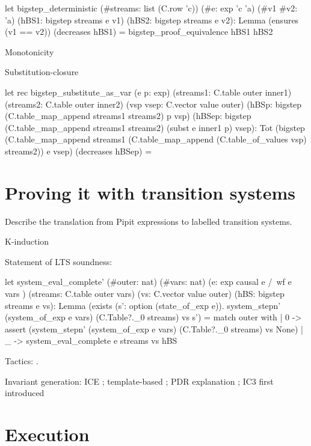 \documentclass[sigplan,screen]{acmart}
\begin{document}
\begin{code}
let bigstep_deterministic
  (#streams: list (C.row 'c))
  (#e: exp 'c 'a)
  (#v1 #v2: 'a)
  (hBS1: bigstep streams e v1) (hBS2: bigstep streams e v2):
    Lemma (ensures (v1 == v2)) (decreases hBS1) =
  bigstep_proof_equivalence hBS1 hBS2
\end{code}

Monotonicity

Substitution-closure
\begin{code}
let rec bigstep_substitute_as_var (e p: exp)
  (streams1: C.table outer inner1)
  (streams2: C.table outer inner2)
  (vsp vsep: C.vector value outer)
  (hBSp: bigstep (C.table_map_append streams1 streams2) p vsp)
  (hBSep: bigstep (C.table_map_append streams1 streams2) (subst e inner1 p) vsep):
    Tot (bigstep (C.table_map_append streams1 (C.table_map_append (C.table_of_values vsp) streams2)) e vsep) (decreases hBSep) =

\end{code}



\section{Proving it with transition systems}

Describe the translation from Pipit expressions to labelled transition systems.

K-induction

Statement of LTS soundness:
\begin{code}
let system_eval_complete'
    (#outer: nat) (#vars: nat)
    (e: exp { causal e /\ wf e vars })
    (streams: C.table outer vars)
    (vs: C.vector value outer)
    (hBS: bigstep streams e vs):
      Lemma (exists (s': option (state_of_exp e)).
        system_stepn'
          (system_of_exp e vars)
          (C.Table?._0 streams) vs s') =
    match outer with
    | 0 -> assert
      (system_stepn'
        (system_of_exp e vars)
        (C.Table?._0 streams) vs None)
    | _ -> system_eval_complete e streams vs hBS
\end{code}

Tactics: \cite{martinez2019meta}.

Invariant generation: ICE \cite{garg2014ice}; template-based \cite{kahsai2011instantiation}; PDR explanation \cite{een2011efficient}; IC3 first introduced \cite{bradley2011sat}

\section{Execution}
\end{document}
